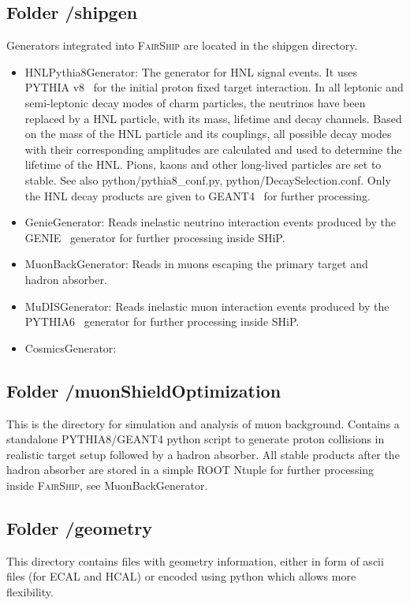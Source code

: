 \documentclass[12pt,a4paper]{article}
\begin{document}
\subsection{Folder /shipgen}
Generators integrated into \textsc{FairShip} are located in the shipgen directory.
\begin{itemize}
\item  HNLPythia8Generator:  The generator for HNL signal events. It uses PYTHIA v8~\cite{pythia8} for the initial proton fixed target interaction. 
In all leptonic and semi-leptonic decay modes of charm particles, the neutrinos have been replaced by a HNL particle, with its
mass, lifetime and decay channels. Based on the mass of the HNL particle and its couplings, all possible decay modes with their
corresponding amplitudes are calculated and used to determine the lifetime of the HNL. Pions, kaons and other long-lived particles are set to stable. 
See also python/pythia8\_conf.py, python/DecaySelection.conf. Only the HNL decay products are given to GEANT4~\cite{Agostinelli:2002hh} for further processing.  

\item  GenieGenerator:     Reads inelastic neutrino interaction events produced by the GENIE~\cite{genie} generator for further processing inside SHiP.  
\item  MuonBackGenerator:  Reads in muons escaping the primary target and hadron absorber.
\item  MuDISGenerator:     Reads inelastic muon interaction events produced by the PYTHIA6~\cite{pythia6} generator for further processing inside SHiP.  
\item  CosmicsGenerator:
\end{itemize}

\subsection{Folder /muonShieldOptimization}
This is the directory for simulation and analysis of muon background. Contains a standalone PYTHIA8/GEANT4 python script to generate proton collisions in realistic target setup followed by a hadron absorber. All stable products after the hadron absorber are stored in a simple ROOT Ntuple for further processing inside \textsc{FairShip}, see MuonBackGenerator.
 

\subsection{Folder /geometry}
This directory contains files with geometry information, either in form of ascii files (for ECAL and HCAL) or encoded using python which allows more flexibility. 
\end{document}
